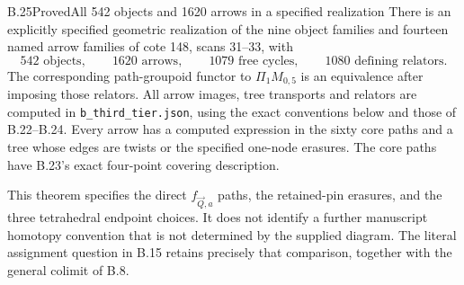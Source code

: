 \begin{result}{B.25}{Proved}{All 542 objects and 1620 arrows in a specified realization}
There is an explicitly specified geometric realization of the
nine object families and fourteen named arrow families of
cote 148, scans 31--33, with
\[
 542\text{ objects},\qquad1620\text{ arrows},\qquad
 1079\text{ free cycles},\qquad1080\text{ defining relators}.
                                                               \tag{B.61}
\]
The corresponding path-groupoid functor to $\Pi_1M_{0,5}$
is an equivalence after imposing those relators.  All arrow
images, tree transports and relators are computed in
\texttt{b\_third\_tier.json}, using the exact conventions below
and those of B.22--B.24.  Every arrow has a computed expression
in the sixty core paths and a tree whose edges are twists or
the specified one-node erasures.  The core paths have B.23's
exact four-point covering description.

This theorem specifies the direct $f_{\vec Q,a}$ paths,
the retained-pin erasures, and the three tetrahedral endpoint
choices.  It does not identify a further manuscript homotopy
convention that is not determined by the supplied diagram.
The literal assignment question in B.15 retains precisely
that comparison, together with the general colimit of B.8.
\end{result}
